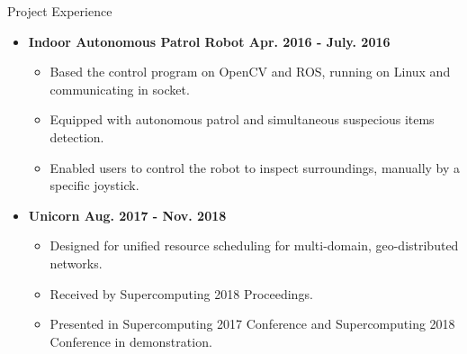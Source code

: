 \documentclass[10pt,oneside]{article}
\newenvironment{ressection}[1]{
	\vspace{4pt}
	{\fontfamily{phv}\selectfont\Large#1}
	\begin{itemize}
	\vspace{3pt}
}{
	\end{itemize}
}
\newcommand{\resitem}[1]{
	\vspace{-4pt}
	\item \begin{flushleft} #1 \end{flushleft}
}
\newcommand{\ressubitem}[1]{
	\vspace{-1pt}
	\item \begin{flushleft} #1 \end{flushleft}
}
\newenvironment{reslist}[1]{
	\resitem{\textbf{#1}}
	\vspace{-5pt}
	\begin{itemize}
}{
	\end{itemize}
}
\begin{document}
\begin{ressection}{Project Experience}
	\begin{reslist}{Indoor Autonomous Patrol Robot \hfill Apr. 2016 - July. 2016}
		\ressubitem{Based the control program on OpenCV and ROS, running on Linux and communicating in socket.}
		\ressubitem{Equipped with autonomous patrol and simultaneous suspecious items detection.}
		\ressubitem{Enabled users to control the robot to inspect surroundings, manually by a specific joystick.}
	\end{reslist}
	\begin{reslist}{Unicorn \hfill Aug. 2017 - Nov. 2018}
		\ressubitem{Designed for unified resource scheduling for multi-domain, geo-distributed networks.}
		\ressubitem{Received by Supercomputing 2018 Proceedings.}
		\ressubitem{Presented in Supercomputing 2017 Conference and Supercomputing 2018 Conference in demonstration.}
	\end{reslist}
\end{ressection}
\end{document}
